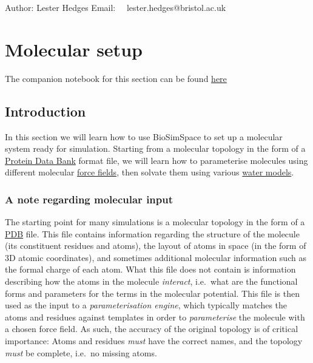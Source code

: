 Author: Lester Hedges Email:~~ lester.hedges@bristol.ac.uk

\hypertarget{molecular-setup}{%
\section{Molecular setup}\label{molecular-setup}}

The companion notebook for this section can be found
\href{https://github.com/michellab/BioSimSpaceTutorials/blob/4844562e7d2cd0b269cead56562ec16a3dfaef7c/01_introduction/02_molecular_setup.ipynb}{here}

\hypertarget{introduction}{%
\subsection{Introduction}\label{introduction}}

In this section we will learn how to use BioSimSpace to set up a
molecular system ready for simulation. Starting from a molecular
topology in the form of a \href{https://www.rcsb.org/}{Protein Data
Bank} format file, we will learn how to parameterise molecules using
different molecular
\href{https://en.wikipedia.org/wiki/Force_field_(chemistry)}{force
fields}, then solvate them using various
\href{https://en.wikipedia.org/wiki/Water_model}{water models}.

\hypertarget{a-note-regarding-molecular-input}{%
\subsubsection{A note regarding molecular
input}\label{a-note-regarding-molecular-input}}

The starting point for many simulations is a molecular topology in the
form of a \href{https://www.rcsb.org/}{PDB} file. This file contains
information regarding the structure of the molecule (its constituent
residues and atoms), the layout of atoms in space (in the form of 3D
atomic coordinates), and sometimes additional molecular information such
as the formal charge of each atom. What this file does not contain is
information describing how the atoms in the molecule \emph{interact},
i.e.~what are the functional forms and parameters for the terms in the
molecular potential. This file is then used as the input to a
\emph{parameterisation engine}, which typically matches the atoms and
residues against templates in order to \emph{parameterise} the molecule
with a chosen force field. As such, the accuracy of the original
topology is of critical importance: Atoms and residues \emph{must} have
the correct names, and the topology \emph{must} be complete, i.e.~no
missing atoms.

